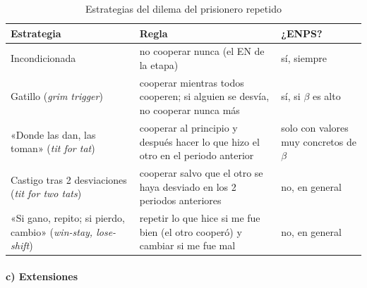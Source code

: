 \documentclass[11pt]{article}
\begin{document}
\begin{table}[H]
\centering
\caption{Estrategias del dilema del prisionero repetido}\label{tab:estrategias-repetidas}
\begin{tabular}{>{\raggedright\arraybackslash}m{3.8cm}>{\raggedright\arraybackslash}m{7.4cm}>{\centering\arraybackslash}m{3.2cm}}
\toprule
\rowcolor{tceeazulpalido}\textbf{Estrategia} & \textbf{Regla} & \textbf{¿ENPS?}\\
\midrule
Incondicionada & no cooperar nunca (el EN de la etapa) & sí, siempre\\
\addlinespace[0.3em]
Gatillo (\emph{grim trigger}) & cooperar mientras todos cooperen; si alguien se desvía, no cooperar nunca más & sí, si $\beta$ es alto\\
\addlinespace[0.3em]
«Donde las dan, las toman» (\emph{tit for tat}) & cooperar al principio y después hacer lo que hizo el otro en el periodo anterior & solo con valores muy concretos de $\beta$\\
\addlinespace[0.3em]
Castigo tras 2 desviaciones (\emph{tit for two tats}) & cooperar salvo que el otro se haya desviado en los 2 periodos anteriores & no, en general\\
\addlinespace[0.3em]
«Si gano, repito; si pierdo, cambio» (\emph{win-stay, lose-shift}) & repetir lo que hice si me fue bien (el otro cooperó) y cambiar si me fue mal & no, en general\\
\bottomrule
\end{tabular}
\end{table}

\begin{infografia}[H]
\centering
\caption{Las estrategias del juego repetido como autómatas: cada círculo es lo que la empresa juega este periodo (C, coludir; D, desviarse) y cada flecha, adónde pasa según lo que hizo la rival el periodo anterior; la flecha suelta marca por dónde empieza}\label{figu:estrategias-automatas}
\end{infografia}

\paragraph{c) Extensiones}
\end{document}

